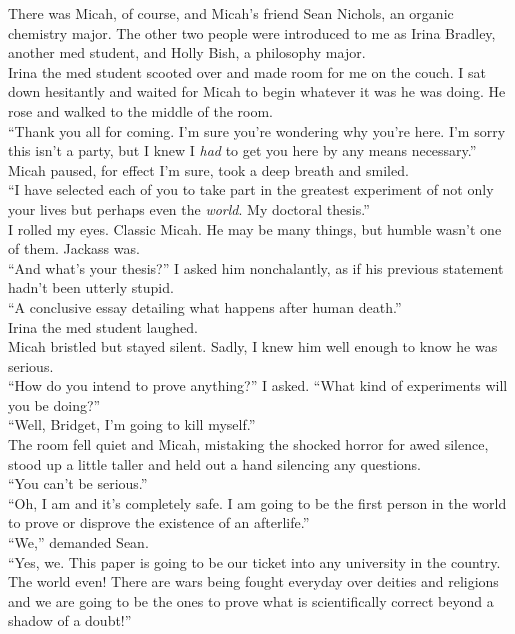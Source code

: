 \documentclass[a5paper]{scrartcl}
\begin{document}
There was Micah, of course, and Micah's friend Sean Nichols, an organic chemistry major. The other two people were introduced to me as Irina Bradley, another med student, and Holly Bish, a philosophy major.\\
Irina the med student scooted over and made room for me on the couch. I sat down hesitantly and waited for Micah to begin whatever it was he was doing. He rose and walked to the middle of the room.\\
\enquote{Thank you all for coming. I'm sure you're wondering why you're here. I'm sorry this isn't a party, but I knew I \textit{had} to get you here by any means necessary.}\\
Micah paused, for effect I'm sure, took a deep breath and smiled.\\
\enquote{I have selected each of you to take part in the greatest experiment of not only your lives but perhaps even the \textit{world}. My doctoral thesis.}\\
I rolled my eyes. Classic Micah. He may be many things, but humble wasn't one of them. Jackass was.\\
\enquote{And what's your thesis?} I asked him nonchalantly, as if his previous statement hadn't been utterly stupid.\\
\enquote{A conclusive essay detailing what happens after human death.}\\
Irina the med student laughed.\\
Micah bristled but stayed silent. Sadly, I knew him well enough to know he was serious.\\
\enquote{How do you intend to prove anything?} I asked. \enquote{What kind of experiments will you be doing?}\\
\enquote{Well, Bridget, I'm going to kill myself.}\\
The room fell quiet and Micah, mistaking the shocked horror for awed silence, stood up a little taller and held out a hand silencing any questions.\\
\enquote{You can't be serious.}\\
\enquote{Oh, I am and it's completely safe. I am going to be the first person in the world to prove or disprove the existence of an afterlife.}\\
\enquote{We,} demanded Sean.\\
\enquote{Yes, we. This paper is going to be our ticket into any university in the country. The world even! There are wars being fought everyday over deities and religions and we are going to be the ones to prove what is scientifically correct beyond a shadow of a doubt!}\\
\end{document}
